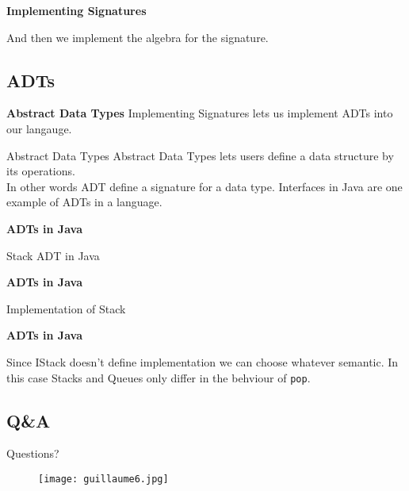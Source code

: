 \begin{frame}[fragile]{\textbf{Implementing Signatures}}
    \begin{example}
        And then we implement the algebra for the signature.
        
    \end{example}
\end{frame}

\subsection*{ADTs}
\begin{frame}{\textbf{Abstract Data Types}}
    \Large
    Implementing Signatures lets us implement ADTs into our langauge.
    \begin{block}{Abstract Data Types}
        Abstract Data Types lets users define a data structure by its operations.\\
        In other words ADT define a signature for a data type. 
        Interfaces in Java are one example of ADTs in a language.
    \end{block}
\end{frame}

\begin{frame}[fragile]{\textbf{ADTs in Java}}
    \begin{example}
        Stack ADT in Java
        
    \end{example}
\end{frame}

\begin{frame}[fragile]{\textbf{ADTs in Java}}
    \begin{example}
        Implementation of Stack
        
    \end{example}
\end{frame}

\begin{frame}[fragile]{\textbf{ADTs in Java}}
    \begin{example}
        Since IStack doesn't define implementation we can choose whatever semantic.
        In this case Stacks and Queues only differ in the behviour of \texttt{pop}.
        
    \end{example}
\end{frame}

\subsection*{Q\&A}
\begin{frame}{Questions?}
    \begin{figure}
        \centering
        \texttt{[image: guillaume6.jpg]}
    \end{figure}
\end{frame}
